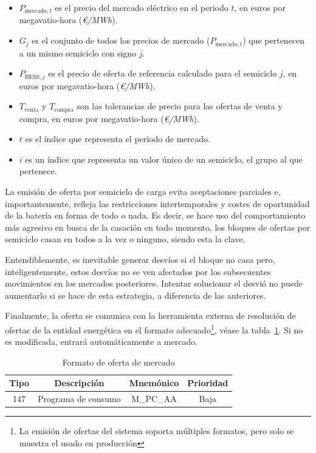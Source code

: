 \begin{itemize}
  \item \( P_{\text{mercado}, t} \) es el precio del mercado eléctrico en el periodo \( t \), en euros por megavatio-hora (\textit{€/MWh}).

  \item \( G_{j} \) es el conjunto de todos los precios de mercado (\( P_{\text{mercado}, t} \)) que pertenecen a un mismo semiciclo con signo \( j \).

  \item \( P_{\text{BESS}, j} \) es el precio de oferta de referencia calculado para el semiciclo \( j \), en euros por megavatio-hora (\textit{€/MWh}).

  \item \( T_{\text{venta}} \) y \( T_{\text{compra}} \) son las tolerancias de precio para las ofertas de venta y compra, en euros por megavatio-hora (\textit{€/MWh}).

  \item \( t \) es el índice que representa el periodo de mercado.

  \item \( i \) es un índice que representa un valor único de un semiciclo, el grupo al que pertenece.

\end{itemize}

La emisión de oferta por semiciclo de carga evita aceptaciones parciales e, importantemente, refleja las restricciones intertemporales y costes de oportunidad de la batería en forma de todo o nada. Es decir, se hace uso del comportamiento más agresivo en busca de la casación en todo momento, los bloques de ofertas por semiciclo casan en todos a la vez o ninguno, siendo esta la clave.

Entendiblemente, es inevitable generar desvíos si el bloque no casa pero, inteligentemente, estos desvíos no se ven afectados por los subsecuentes movimientos en los mercados posteriores. Intentar solucionar el desvió no puede aumentarlo si se hace de esta estrategia, a diferencia de las anteriores.

Finalmente, la oferta se comunica con la herramienta externa de resolución de ofertas de la entidad energética en el formato adecuado\footnote{La emisión de ofertas del sistema soporta múltiples formatos, pero solo se muestra el usado en producción}, véase la tabla~\ref{tab:formato-oferta}. Si no es modificada, entrará automáticamente a mercado.


\begin{table}[ht]
  \centering
  \begin{tabular}{|c|c|c|c|}
    \hline
    Tipo & Descripción         & Mnemónico & Prioridad\\
    \hline
    147  & Programa de consumo & M\_PC\_AA & Baja     \\
    \hline
  \end{tabular}
  \caption{Formato de oferta de mercado}
  \label{tab:formato-oferta}
\end{table}

